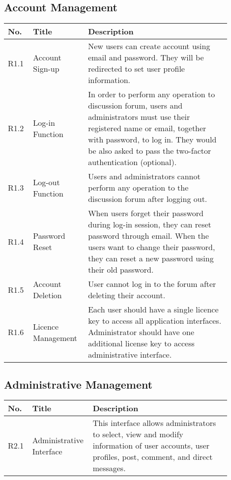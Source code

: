 \documentclass[a4paper,11pt]{scrreprt}
\begin{document}
\subsection{Account Management}
\begin{tabular}{|>{\centering\arraybackslash}m{0.1\linewidth}|>{\centering\arraybackslash}m{0.2\linewidth}|m{0.6\linewidth}|} \hline
     No.&  Title&Description\\ \hline 
     R1.1&   Account Sign-up &New users can create account using email and password. They will be redirected to set user profile information.\\ \hline 
     R1.2&   Log-in Function&In order to perform any operation to discussion forum, users and administrators must use their registered name or email, together with password, to log in. They would be also asked to pass the two-factor authentication (optional).\\ \hline 
     R1.3&   Log-out Function&Users and administrators cannot perform any operation to the discussion forum after logging out.\\ \hline 
     R1.4&   Password Reset &When users forget their password during log-in session, they can reset password through email. When the users want to change their password, they can reset a new password using their old password.\\ \hline 
     R1.5&   Account Deletion&User cannot log in to the forum after deleting their account.\\\hline
 R1.6& Licence Management&Each user should have a single licence key to access all application interfaces. Administrator should have one additional license key to access administrative interface.\\\hline
\end{tabular}

\smallskip

\subsection{Administrative Management}
\begin{tabular}{|>{\centering\arraybackslash}m{0.1\linewidth}|>{\centering\arraybackslash}m{0.2\linewidth}|m{0.6\linewidth}|} \hline
     No.&  Title&Description\\ \hline 
     R2.1&   Administrative Interface&This interface allows administrators to select, view and modify information of user accounts, user profiles, post, comment, and direct messages.\\\hline
\end{tabular}
\end{document}
